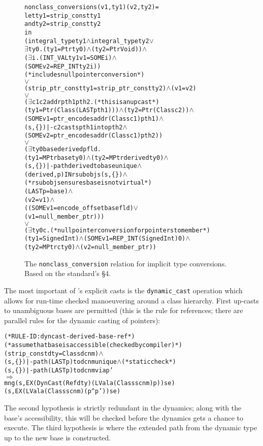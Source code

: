 \documentclass[11pt]{article}
\newcommand{\lbr}{\texttt{\{}}
\newcommand{\rbr}{\texttt{\}}}
\begin{document}
\begin{figure}
\begin{alltt}
  nonclass_conversion s (v1,ty1) (v2,ty2) =
    let ty1 = strip_const ty1
    and ty2 = strip_const ty2
    in
      (integral_type ty1 \(\land\) integral_type ty2 \(\lor\)
       \(\exists\)ty0. (ty1 = Ptr ty0) \(\land\) (ty2 = Ptr Void)) \(\land\)
      (\(\exists\)i. (INT_VAL ty1 v1 = SOME i) \(\land\)
           (SOME v2 = REP_INT ty2 i))
              (* includes null pointer conversion *)
         \(\lor\)
      (strip_ptr_const ty1 = strip_ptr_const ty2) \(\land\) (v1 = v2)
         \(\lor\)
      (\(\exists\)c1 c2 addr pth1 pth2.  (* this is an upcast *)
          (ty1 = Ptr (Class (LAST pth1))) \(\land\) (ty2 = Ptr (Class c2)) \(\land\)
          (SOME v1 = ptr_encode s addr (Class c1) pth1) \(\land\)
          (s,\lbr\rbr) |- c2 casts pth1 into pth2 \(\land\)
          (SOME v2 = ptr_encode s addr (Class c1) pth2))
         \(\lor\)
      (\(\exists\)ty0 base derived p fld.
          (ty1 = MPtr base ty0) \(\land\) (ty2 = MPtr derived ty0) \(\land\)
          (s,\lbr\rbr) |- path derived to base unique \(\land\)
          (derived, p) IN rsubobjs (s,\lbr\rbr) \(\land\)
             (* rsubobjs ensures base is not virtual *)
          (LAST p = base) \(\land\)
          (v2 = v1) \(\land\)
          ((SOME v1 = encode_offset base fld) \(\lor\)
           (v1 = null_member_ptr)))
         \(\lor\)
      (\(\exists\)ty0 c. (* null pointer conversion for pointers to member *)
          (ty1 = Signed Int) \(\land\) (SOME v1 = REP_INT (Signed Int) 0) \(\land\)
          (ty2 = MPtr c ty0) \(\land\) (v2 = null_member_ptr))
\end{alltt}
\caption{The \texttt{nonclass_conversion} relation for implicit type
  conversions.  Based on the standard's \S4.}
\label{fig:nonclass-conversion}
\end{figure}

The most important of \cpp{}'s explicit casts is the
\texttt{dynamic_cast} operation which allows for run-time checked
manoeuvering around a class hierarchy.  First up-casts to unambiguous bases
are permitted (this is the rule for references; there are parallel
rules for the dynamic casting of pointers):
%
\begin{alltt}
(* RULE-ID: dyncast-derived-base-ref *)
(* assume that base is accessible (checked by compiler) *)
     (strip_const dty = Class dcnm) \(\land\)
     (s,\lbr\rbr) |- path (LAST p) to dcnm unique \(\land\) (* static check *)
     (s,\lbr\rbr) |- path (LAST p) to dcnm via p'
   \(\Rightarrow\)
     mng (s, EX (DynCast (Ref dty) (LVal a (Class scnm) p)) se)
         (s, EX (LVal a (Class scnm) (p ^ p')) se)
\end{alltt}
The second hypothesis is strictly redundant in the dynamics; along
with the base's accessibility, this will be checked before the
dynamics gets a chance to execute.  The third hypothesis is where the
extended path from the dynamic type up to the new base is
constructed.
\end{document}
